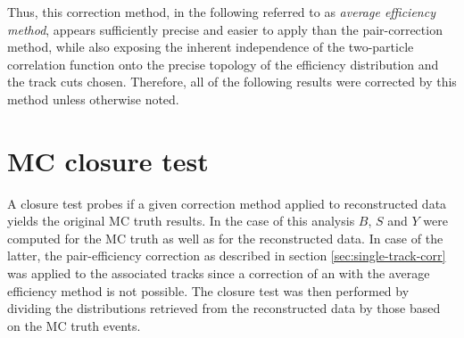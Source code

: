 Thus, this correction method, in the following referred to as \emph{average efficiency method}, appears sufficiently precise and easier to apply than the pair-correction method, while also exposing the inherent independence of the two-particle correlation function onto the precise topology of the efficiency distribution and the track cuts chosen. Therefore, all of the following results were corrected by this method unless otherwise noted.


\section{MC closure test}
\label{sec:mc-closure}
A closure test probes if a given correction method applied to reconstructed data yields the original MC truth results. In the case of this analysis $B$, $S$ and $Y$ were computed for the MC truth as well as for the reconstructed data. In case of the latter, the pair-efficiency correction as described in section \ref{sec:single-track-corr} was applied to the associated tracks since a correction of \Sig an \B with the average efficiency method is not possible. The closure test was then performed by dividing the distributions retrieved from the reconstructed data by those based on the MC truth events.

